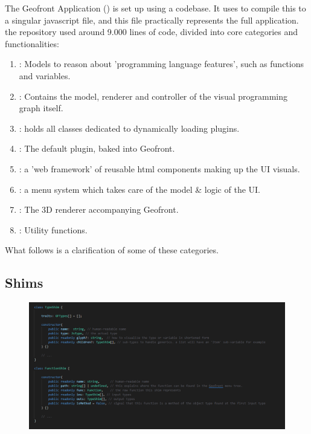 The Geofront Application () is set up using a  codebase. It uses  to compile this to a singular javascript file, and this file practically represents the full application. 
the repository used around 9.000 lines of code, divided into core categories and functionalities:
\begin{enumerate}[I]
  \item {}: Models to reason about 'programming language features', such as functions and variables.
  \item {}: Contains the model, renderer and controller of the visual programming graph itself.  
  \item {}: holds all classes dedicated to dynamically loading plugins.
  \item {}: The default plugin, baked into Geofront.   
  \item {}: a 'web framework' of reusable html components making up the UI visuals.
  \item {}: a menu system which takes care of the model \& logic of the UI.
  \item {}: The 3D renderer accompanying Geofront.
  \item {}: Utility functions.   
\end{enumerate}
What follows is a clarification of some of these categories.

\subsection{Shims}

\begin{figure}
  \centering
  \graphicspath{ {../../assets/images/implementation/} }
  \includegraphics[width=\linewidth]{shim-uml.png}
  \caption[Shim Classes]{}
  \label{fig:shim-classes}
\end{figure}

